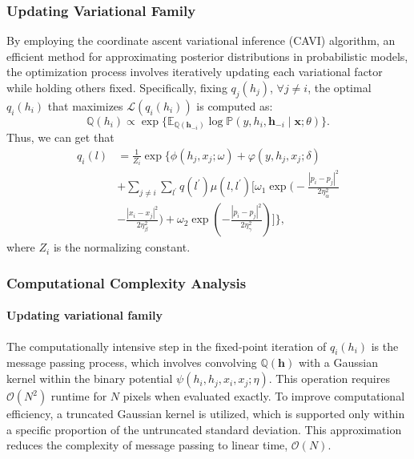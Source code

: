 \documentclass[conference]{IEEEtran}
\newcommand{\EE}{{\mathbb{E}}}
\newcommand{\hb}{\mathbf{h}}
\newcommand{\Lc}{\mathcal{L}}
\newcommand{\PP}{{\mathbb{P}}}
\newcommand{\QQ}{{\mathbb{Q}}}
\newcommand{\xb}{\mathbf{x}}
\newcommand{\Oc}{\mathcal{O}}
\let\oldsubsubsection\subsubsection
\renewcommand{\subsubsection}[1]{\oldsubsubsection{\textbf{#1}}}
\begin{document}
\subsubsection{Updating Variational Family}


By employing the coordinate ascent variational inference (CAVI) algorithm,
an efficient method for approximating posterior distributions in probabilistic
models, the optimization process involves iteratively updating each variational
factor while holding others fixed. Specifically, fixing $q_j(h_j)$,
$\forall j \neq i$, the optimal $q_i(h_i)$ that maximizes $\Lc(q_i(h_i))$
is computed as:
\begin{equation*}
\QQ(h_i) \propto \exp\{\EE_{\QQ(\hb_{-i})}
\log\PP(y, h_i, \hb_{-i} \mid \xb; \theta)\}.
\end{equation*}
Thus, we can get that
\begin{equation*}
\begin{split}
q_i(l) &= \frac{1}{Z_i} \exp \Bigg\{
\phi(h_j, x_j; \omega) + \varphi(y, h_j, x_j; \delta) \\
&+ \sum_{j \neq i} \sum_{l^\prime} q(l^\prime) \mu(l, l^\prime) 
\Bigg[ \omega_1 \exp \bigg(
- \frac{\left\lvert p_i - p_j \right\rvert^2}{2\eta_\alpha^2}\\
&- \frac{\left\lvert x_i - x_j \right\rvert^2}{2\eta_\beta^2}
\bigg)
+ \omega_2 \exp \left(
- \frac{\left\lvert p_i - p_j 
\right\rvert^2}{2\eta_\gamma^2}
\right)
\Bigg]
\Bigg\},
\end{split}
\end{equation*}
where $Z_i$ is the normalizing constant.


\subsubsection{Computational Complexity Analysis}


\paragraph{Updating variational family}


The computationally intensive step in the fixed-point iteration of $q_i(h_i)$
is the message passing process, which involves convolving $\QQ(\hb)$ with a
Gaussian kernel within the binary potential $\psi(h_i, h_j, x_i, x_j; \eta)$.
This operation requires $\Oc(N^2)$ runtime for $N$ pixels when evaluated
exactly. To improve computational efficiency, a truncated Gaussian kernel is
utilized, which is supported only within a specific proportion of the
untruncated standard deviation. This approximation reduces the complexity of 
message passing to linear time, $\Oc(N)$.
\end{document}
